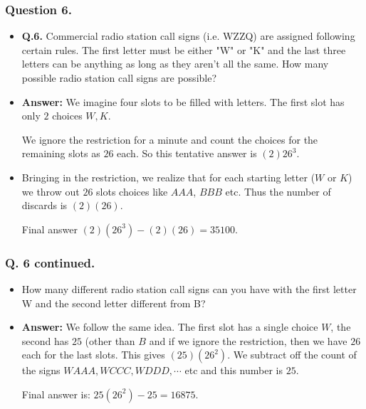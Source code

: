 \begin{frame}%
  \frametitle{Question 6.}
  \begin{itemize}%
\item {\bf Q.6.}
Commercial radio station call signs (i.e. WZZQ) are assigned following certain rules.
The first letter must be either "W" or "K" and the last three letters can be anything
as long as they aren't all the same.  How many possible radio station call signs are possible?

\item {\bf Answer:}
We imagine four slots to be filled with letters. The first slot  has only $2$
choices $W,K$.

We ignore the restriction for a minute and count the choices for the
remaining slots as $26$ each. So this tentative answer is $(2)26^3$.

\item Bringing in the restriction, we realize that for each starting
letter ($W$ or $K$) we throw out $26$ slots choices like $AAA$, $BBB$
etc. Thus the number of discards is $(2)(26)$.

Final answer $(2)(26^3) - (2)(26) = 35100$.
      

\end{itemize}
\end{frame}

%



\begin{frame}%
  \frametitle{Q. 6 continued.}
  \begin{itemize}%
 
\item
               
How many different radio station call signs can you have with the first letter W
and the second letter different from B?

\item {\bf Answer:} We follow the same idea. The first slot has a single
choice $W$, the second has $25$ (other than $B$ and if we ignore the
restriction, then we have $26$ each for the last slots.
This gives $(25)(26^2)$. We subtract off the count of the signs $WAAA,
WCCC, WDDD, \cdots $ etc and this number is $25$.

Final answer is: $25(26^2) - 25 = 16875$.


\end{itemize}
\end{frame}

